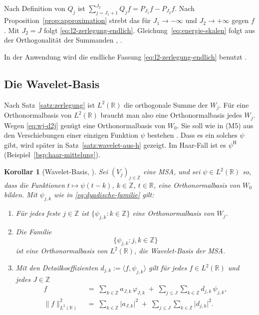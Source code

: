 \documentclass[a4paper,11pt,bibliography=totoc,listof=totoc,headinclude=true,cleardoublepage=empty,oneside]{scrbook}
\theoremstyle{plain}
\newtheorem{Korollar}[Satz]{Korollar}
\theoremstyle{definition}
\newcommand{\R}{\mathbb{R}}
\newcommand{\Z}{\mathbb{Z}}
\newcommand{\LZwei}{L^2(\R)}
\newcommand{\scal}[2]{\langle #1, #2 \rangle}
\newcommand{\norm}[1]{\lVert #1 \rVert}
\begin{document}
Nach Definition von $Q_j$ ist
$\sum_{j=J_1+1}^{J_2} Q_j f = P_{J_1} f - P_{J_2} f$. Nach
Proposition~\ref{prop:approximation} strebt das für $J_1 \to -\infty$ und
$J_2 \to +\infty$ gegen $f$. Mit $J_2 = J$ folgt
\eqref{eq:l2-zerlegung-endlich}. Gleichung~\eqref{eq:energie-skalen} folgt aus
der Orthogonalität der Summanden \cite[Prop.~(5.1)]{blatter}, %
\cite[Gl.~(2.2.11), (2.2.12)]{lmr}. %

In der Anwendung wird die endliche Fassung \eqref{eq:l2-zerlegung-endlich}
benutzt \cite[Kap.~2.2]{lmr}. %
 
\subsection{Die Wavelet-Basis}
\label{subsec:konstruktionsziel}

Nach Satz~\ref{satz:zerlegung} ist $\LZwei$ die orthogonale Summe der $W_j$.
Für eine Orthonormalbasis von $\LZwei$ braucht man also eine Orthonormalbasis
jedes $W_j$. Wegen \eqref{eq:wj-d2j} genügt eine Orthonormalbasis von $W_0$.
Sie soll wie in (M5) aus den Verschiebungen einer einzigen Funktion $\psi$
bestehen \cite[Kap.~5.1]{blatter}. %
Dass es ein solches $\psi$ gibt, wird später in Satz~\ref{satz:wavelet-aus-h} gezeigt. Im
Haar-Fall ist es $\psi^{\mathrm H}$ (Beispiel~\ref{bsp:haar-mittelung}).

\begin{Korollar}[Wavelet-Basis, {\cite[Kap.~5.1]{blatter}}] %
\label{kor:wavelet-basis}
Sei $(V_j)_{j\in\Z}$ eine MSA, und sei $\psi \in \LZwei$ so, dass die Funktionen
$t \mapsto \psi(t-k)$, $k \in \Z$, $t \in \R$, eine Orthonormalbasis von $W_0$ bilden. Mit
$\psi_{j,k}$ wie in \eqref{eq:dyadische-familie} gilt:
\begin{enumerate}
\item[(i)] Für jedes feste $j \in \Z$ ist $\{\psi_{j,k} : k \in \Z\}$ eine
  Orthonormalbasis von $W_j$.
\item[(ii)] Die Familie
  \begin{equation}
  \label{eq:wavelet-basis}
    \bigl\{\psi_{j,k} : j,k \in \Z\bigr\}
  \end{equation}
  ist eine Orthonormalbasis von $\LZwei$, die Wavelet-Basis der MSA.
\item[(iii)] Mit den Detailkoeffizienten $d_{j,k} := \scal{f}{\psi_{j,k}}$ gilt
  für jedes $f \in \LZwei$ und jedes $J \in \Z$
  \begin{equation}
  \label{eq:zerlegung-koeffizienten}
  \begin{aligned}
    f &\;=\; \sum_{k\in\Z} a_{J,k}\,\varphi_{J,k}
         \;+\; \sum_{j\le J}\sum_{k\in\Z} d_{j,k}\,\psi_{j,k},\\
    \norm{f}_{\LZwei}^2 &\;=\; \sum_{k\in\Z}\lvert a_{J,k}\rvert^2
                 \;+\; \sum_{j\le J}\sum_{k\in\Z}\lvert d_{j,k}\rvert^2 .
  \end{aligned}
  \end{equation}
\end{enumerate}
\end{Korollar}
\end{document}
